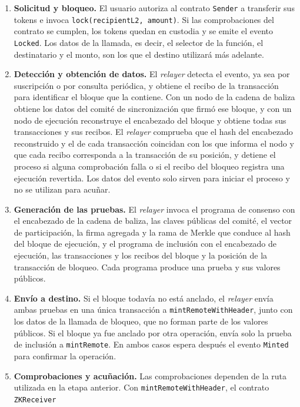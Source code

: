 \begin{enumerate}
	\item \textbf{Solicitud y bloqueo.} El usuario autoriza al contrato \texttt{Sender} a transferir
	sus tokens e invoca \lstinline|lock(recipientL2, amount)|. Si las comprobaciones del contrato se
	cumplen, los tokens quedan en custodia y se emite el evento \texttt{Locked}. Los datos de la
	llamada, es decir, el selector de la función, el destinatario y el monto, son los que el destino
	utilizará más adelante.
	\item \textbf{Detección y obtención de datos.} El \textit{relayer} detecta el evento, ya sea por
	suscripción o por consulta periódica, y obtiene el recibo de la transacción para identificar el
	bloque que la contiene. Con un nodo de la cadena de baliza obtiene los datos del comité de
	sincronización que firmó ese bloque, y con un nodo de ejecución reconstruye el encabezado del
	bloque y obtiene todas sus transacciones y sus recibos. El \textit{relayer} comprueba que el
	hash del encabezado reconstruido y el de cada transacción coincidan con los que informa el nodo
	y que cada recibo corresponda a la transacción de su posición, y detiene el proceso si alguna
	comprobación falla o si el recibo del bloqueo registra una ejecución revertida. Los datos del evento solo sirven para iniciar el proceso y
	no se utilizan para acuñar.
	\item \textbf{Generación de las pruebas.} El \textit{relayer} invoca el programa de consenso con
	el encabezado de la cadena de baliza, las claves públicas del comité, el vector de
	participación, la firma agregada y la rama de Merkle que conduce al hash del bloque de
	ejecución, y el programa de inclusión con el encabezado de ejecución, las transacciones y los
	recibos del bloque y la posición de la transacción de bloqueo. Cada
	programa produce una prueba y sus valores públicos.
	\item \textbf{Envío a destino.} Si el bloque todavía no está anclado, el \textit{relayer} envía
	ambas pruebas en una única transacción a \lstinline|mintRemoteWithHeader|, junto con los datos
	de la llamada de bloqueo, que no forman parte de los valores públicos. Si el bloque ya fue
	anclado por otra operación, envía solo la prueba de inclusión a \lstinline|mintRemote|. En
	ambos casos espera después el evento \texttt{Minted} para confirmar la operación.
	\item \textbf{Comprobaciones y acuñación.} Las comprobaciones dependen de la ruta utilizada en
	la etapa anterior. Con \lstinline|mintRemoteWithHeader|, el contrato \texttt{ZKReceiver}

\end{enumerate}
